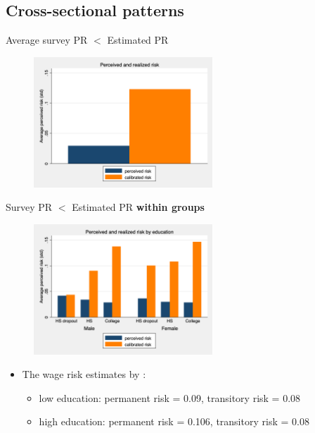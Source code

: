 \documentclass{beamer}
\begin{document}
\subsection{Cross-sectional patterns}


\begin{frame}{Average survey PR $<$ Estimated PR}
	\label{observable_heterogeneity_all}
	\begin{figure}[ht]
		\label{compare_by_gender_all}
		\centering
		\includegraphics[width=0.60\textwidth]{figures/boxplot_rvar_compare_simple.png}
	\end{figure}
\end{frame}


\begin{frame}{Survey PR $<$ Estimated PR \textbf{within groups}}
	\label{observable_heterogeneity_by_educ}
	\begin{figure}[ht]
		\label{compare_by_gender_educ}
		\centering
		\includegraphics[width=0.60\textwidth]{figures/boxplot_rvar_compare_educ_simple.png}
	\end{figure}
\pause 
	\begin{itemize}
		\item The wage risk estimates by  \cite{low2010wage}: 
		\begin{itemize}
			\item low education: permanent risk = 0.09, transitory risk = 0.08
			\item high education: permanent risk = 0.106, transitory risk = 0.08
	\end{itemize}
\end{itemize}
\end{frame}
\end{document}
